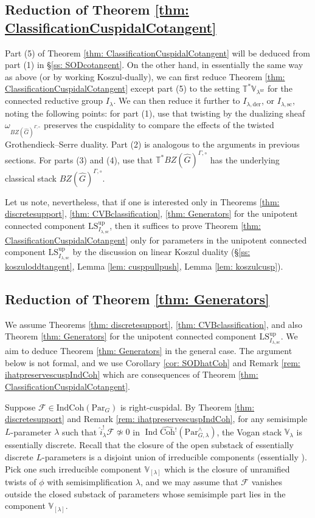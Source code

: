\documentclass{amsart}
\theoremstyle{definition}
\theoremstyle{remark}
\numberwithin{equation}{section}
\DeclareMathOperator{\Ind}{Ind}
\newcommand{\der}{\mathrm{der}}
\newcommand{\mc}{\mathcal}
\newcommand{\Sc}{\mathrm{sc}}
\newcommand{\wh}{\widehat}
\newcommand{\Par}{\mathrm{Par}}
\newcommand{\IndCoh}{\mathrm{IndCoh}}
\newcommand{\Coh}{\mathrm{Coh}}
\newcommand{\ur}{\mathrm{ur}}
\newcommand{\V}{\mathbb{V}}
\newcommand{\T}{\mathbb{T}}
\newcommand{\up}{\mathrm{up}}
\newcommand{\LS}{\mathrm{LS}}
\begin{document}
\subsection{Reduction of Theorem \ref{thm: ClassificationCuspidalCotangent}}{\label{ss: reductionurclassificationcuspidalcotangent}}
Part (5) of Theorem \ref{thm: ClassificationCuspidalCotangent} will be deduced from part (1) in \S \ref{ss: SODcotangent}. On the other hand, in essentially the same way as above (or by working Koszul-dually), we can first reduce Theorem \ref{thm: ClassificationCuspidalCotangent} except part (5) to the setting $\T^* \V_{\lambda^\ur}$ for the connected reductive group $I_\lambda$. We can then reduce it further to $I_{\lambda, \der}$, or $I_{\lambda, \Sc}$, noting the following points: for part (1), use that twisting by the dualizing sheaf $\omega_{BZ(\wh G)^{\Gamma,\circ}}$ preserves the cuspidality to compare the effects of the twisted Grothendieck--Serre duality. Part (2) is analogous to the arguments in previous sections. For parts (3) and (4), use that $\T^* BZ(\wh G)^{\Gamma,\circ}$ has the underlying classical stack $BZ(\wh G)^{\Gamma,\circ}$. 

Let us note, nevertheless, that if one is interested only in Theorems \ref{thm: discretesupport}, \ref{thm: CVBclassification}, \ref{thm: Generators} for the unipotent connected component $\LS^\up_{I_{\lambda, \Sc}}$, then it suffices to prove Theorem \ref{thm: ClassificationCuspidalCotangent} only for parameters in the unipotent connected component $\LS^\up_{I_{\lambda, \Sc}}$ by the discussion on linear Koszul duality (\S \ref{ss: koszuloddtangent}, Lemma \ref{lem: cusppullpush}, Lemma \ref{lem: koszulcusp}). 

\subsection{Reduction of Theorem \ref{thm: Generators}}{\label{ss: reductiongenerators}} 

We assume Theorems \ref{thm: discretesupport}, \ref{thm: CVBclassification}, and also Theorem \ref{thm: Generators} for the unipotent connected component $\LS^\up_{I_{\lambda, \Sc}}$. We aim to deduce Theorem \ref{thm: Generators} in the general case. The argument below is not formal, and we use Corollary \ref{cor: SODhatCoh} and Remark \ref{rem: ihatpreservescuspIndCoh} which are consequences of Theorem \ref{thm: ClassificationCuspidalCotangent}. 

Suppose $\mc F\in \IndCoh(\Par_G)$ is right-cuspidal. By Theorem \ref{thm: discretesupport} and Remark \ref{rem: ihatpreservescuspIndCoh}, for any semisimple $L$-parameter $\lambda$ such that $\wh{i}^!_\lambda\mc F\not\simeq 0$ in $\Ind\wh{\Coh}{}^! (\Par^\wedge_{G,\lambda})$, the Vogan stack $\V_\lambda$ is essentially discrete. Recall that the closure of the open substack of essentially discrete $L$-parameters is a disjoint union of irreducible components (essentially \cite[Proposition 2.32]{ZhuTame}). Pick one such irreducible component $\V_{[\lambda]}$ which is the closure of unramified twists of $\phi$ with semisimplification $\lambda$, and we may assume that $\mc F$ vanishes outside the closed substack of parameters whose semisimple part lies in the component $\V_{[\lambda]}$. 
\end{document}
